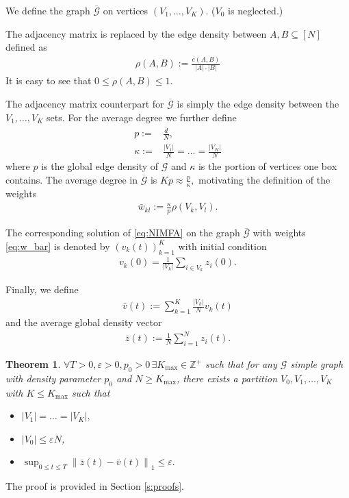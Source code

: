 \documentclass{article}
\newcommand{\1}[1]{{\mathds{1}}_{\left\{#1\right\}}}
\newtheorem{theorem}{Theorem}
\newcommand{\rem}[1]{{#1}}
\begin{document}
	We define the graph $\overline{\mathcal{G}}$ on vertices $\left(V_1, \dots, V_K\right)$. ($V_0$ is neglected.)   
	
	The adjacency matrix is replaced by the edge density between $A,B \subseteq [N]$ defined as
	\begin{align}
		\label{eq:rho}
		\rho(A,B):=\frac{e\left(A,B\right)}{\left|A\right| \cdot \left|B \right|}
	\end{align}
	It is easy to see that $0 \leq \rho\left(A,B\right) \leq 1.$
	
	The adjacency matrix counterpart for $\overline{\mathcal{G}}$ is simply the edge density between the $V_1,\dots,V_K$ sets. For the average degree we further define
	\begin{align}
		\label{eq:p}
		p:=& \frac{\bar{d}}{N}, \\
		\label{eq:kappa}
		\kappa:=&\frac{\left| V_1\right|}{N}=\dots = \frac{\left| V_K\right|}{N}
	\end{align}
	where $p$ is the global edge density of $\mathcal{G}$ and $\kappa$ is the portion of vertices one box contains. The average degree in $\overline{\mathcal{G}}$ is $K p \approx \frac{p}{\kappa},$ motivating the definition of the weights
	\begin{align}
		\label{eq:w_bar}
		\bar{w}_{kl}:= \frac{\kappa}{p} \rho \left(V_{k},V_{l} \right).
	\end{align}
	
	The corresponding solution of \eqref{eq:NIMFA} on the graph $\overline{\mathcal{G}}$ with weights \eqref{eq:w_bar} is denoted by $\left(v_{k}(t) \right)_{k=1}^{K}$ with initial condition
	\begin{align}
		\label{eq:v(0)} 
		v_{k}(0)=\frac{1}{|V_k|}\sum_{ i \in V_k}z_{i}(0).
	\end{align} 
	
	Finally, we define
	\begin{align}
		\label{eq:v_bar}
		\bar{v}(t):= \sum_{k=1}^{K} \frac{\left|V_k \right|}{N}v_{k}(t)
	\end{align}
	and the average global density vector
	\begin{align}
		\label{eq:z_bar}
		\bar{z}(t):=\frac{1}{N}\sum_{i=1}^{N}z_{i}(t).
	\end{align}
	
	\begin{theorem}
		\label{t:Szemeredi}
		$\forall T>0, \varepsilon>0, p_0>0 \, \exists K_{\max} \in \mathbb{Z}^{+}$ such that for any $\mathcal{G}$ simple graph with density parameter $p_0$ and $N \geq K_{\textrm{max}} $, there exists a partition $V_0, V_1, \dots, V_K$ with $K \leq  K_{\max}$ such that
		\begin{itemize}
			\item $\left|V_1 \right|= \dots =\left|V_K \right|\rem{,}$
			\item $\left|V_0 \right| \leq  \varepsilon N$,
			\item \rem{ $\sup_{0 \leq t \leq T} \left \|\bar{z}(t)-\bar{v}(t) \right \|_1 \leq  \varepsilon.$}
		\end{itemize}
	\end{theorem}
	The proof is provided in Section \ref{s:proofs}.
	
\end{document}
